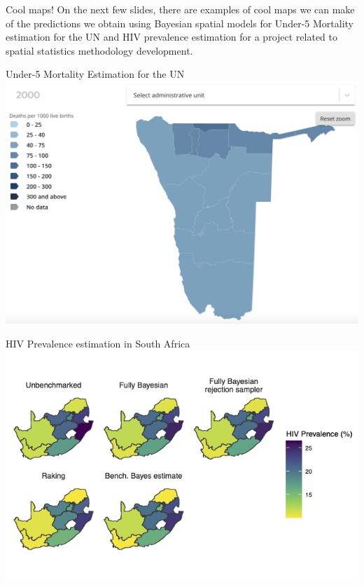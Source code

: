 \documentclass[10pt,t]{beamer}
\begin{document}
\begin{frame}{Cool maps!}
On the next few slides, there are examples of cool maps we can make of the predictions we obtain using Bayesian spatial models for Under-5 Mortality estimation for the UN and HIV prevalence estimation for a project related to spatial statistics methodology development.
\end{frame}

\begin{frame}{Under-5 Mortality Estimation for the UN}
\centering \includegraphics[scale=0.4]{namibia_igme.png}
\end{frame}

\begin{frame}{HIV Prevalence estimation in South Africa}
\centering \includegraphics[scale=0.4]{map_compare_medians.png}
\end{frame}
\end{document}
